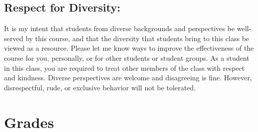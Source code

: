 \documentclass{tufte-handout}
\begin{document}
\begin{fullwidth}
\subsection{Respect for Diversity: } 

It is my intent that students from diverse backgrounds and perspectives be well-served by this course, and that the diversity that students bring to this class be viewed as a resource. Please let me know ways to improve the effectiveness of the course for you, personally, or for other students or student groups. As a student in this class, you are required to treat other members of the class with respect and kindness. Diverse perspectives are welcome and disagreeing is fine. However, disrespectful, rude, or exclusive behavior will not be tolerated.



\end{fullwidth}

\section{Grades}
\end{document}
